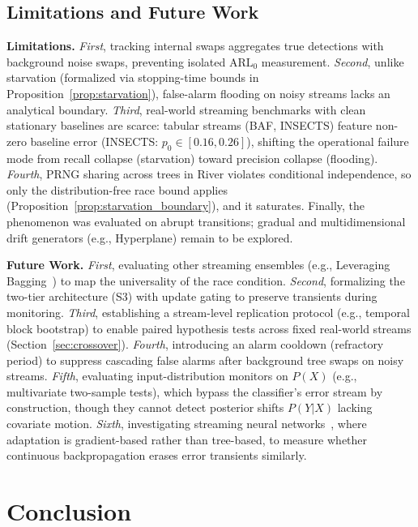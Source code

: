 \documentclass[10pt,conference]{IEEEtran}
\theoremstyle{definition}
\begin{document}
\subsection{Limitations and Future Work}\label{sec:limitations}
\textbf{Limitations.} \emph{First}, tracking internal swaps aggregates true detections with background noise swaps, preventing isolated $\mathrm{ARL}_0$ measurement. \emph{Second}, unlike starvation (formalized via stopping-time bounds in Proposition~\ref{prop:starvation}), false-alarm flooding on noisy streams lacks an analytical boundary. \emph{Third}, real-world streaming benchmarks with clean stationary baselines are scarce: tabular streams (BAF, INSECTS) feature non-zero baseline error (INSECTS: $p_0 \in [0.16, 0.26]$), shifting the operational failure mode from recall collapse (starvation) toward precision collapse (flooding). \emph{Fourth}, PRNG sharing across trees in River violates conditional independence, so only the distribution-free race bound applies (Proposition~\ref{prop:starvation_boundary}), and it saturates. Finally, the phenomenon was evaluated on abrupt transitions; gradual and multidimensional drift generators (e.g., Hyperplane) remain to be explored.

\textbf{Future Work.} \emph{First}, evaluating other streaming ensembles (e.g., Leveraging Bagging~\cite{bifet_leveraging_2010}) to map the universality of the race condition. \emph{Second}, formalizing the two-tier architecture (S3) with update gating to preserve transients during monitoring. \emph{Third}, establishing a stream-level replication protocol (e.g., temporal block bootstrap) to enable paired hypothesis tests across fixed real-world streams (Section~\ref{sec:crossover}). \emph{Fourth}, introducing an alarm cooldown (refractory period) to suppress cascading false alarms after background tree swaps on noisy streams. \emph{Fifth}, evaluating input-distribution monitors on $P(X)$ (e.g., multivariate two-sample tests), which bypass the classifier's error stream by construction, though they cannot detect posterior shifts $P(Y|X)$ lacking covariate motion. \emph{Sixth}, investigating streaming neural networks~\cite{gama_survey_2014}, where adaptation is gradient-based rather than tree-based, to measure whether continuous backpropagation erases error transients similarly.

\section{Conclusion}\label{sec:conclusion}
\end{document}
